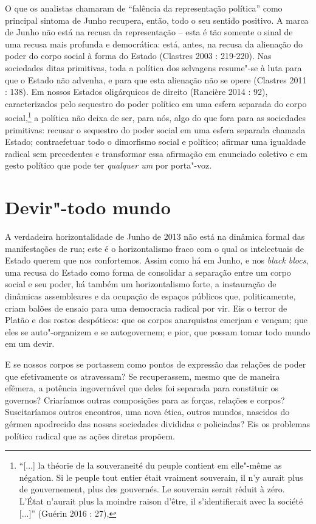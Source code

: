 O que os analistas chamaram de ``falência da representação política''
como principal sintoma de Junho recupera, então, todo o seu sentido
positivo. A marca de Junho não está na recusa da representação -- esta é
tão somente o sinal de uma recusa mais profunda e democrática: está,
antes, na recusa da alienação do poder do corpo social à forma do Estado
(Clastres 2003 : 219-220). Nas sociedades ditas primitivas, toda a
política dos selvagens resume"-se à luta para que o Estado não advenha, e
para que esta alienação não se opere (Clastres 2011 : 138). Em nossos
Estados oligárquicos de direito (Rancière 2014 : 92), caracterizados
pelo sequestro do poder político em uma esfera separada do corpo
social,\footnote{``{[}...{]} la théorie de la souveraneité du peuple
  contient em elle"-même as négation. Si le peuple tout entier était
  vraiment souverain, il n'y aurait plus de gouvernement, plus des
  gouvernés. Le souverain serait réduit à zéro. L'État n'aurait plus la
  moindre raison d'être, il s'identifierait avec la société {[}...{]}''
  (Guérin 2016 : 27),} a política não deixa de ser, para nós, algo do
que fora para as sociedades primitivas: recusar o sequestro do poder
social em uma esfera separada chamada Estado; contraefetuar todo o
dimorfismo social e político; afirmar uma igualdade radical sem
precedentes e transformar essa afirmação em enunciado coletivo e em
gesto político que pode ter \emph{qualquer um }por porta"-voz.

\section{Devir"-todo mundo}

A verdadeira horizontalidade de Junho de
2013 não está na dinâmica formal das manifestações de rua; este é o
horizontalismo fraco com o qual os intelectuais de Estado querem que nos
confortemos. Assim como há em Junho, e nos \emph{black blocs}, uma
recusa do Estado como forma de consolidar a separação entre um corpo
social e seu poder, há também um horizontalismo forte, a instauração de
dinâmicas assembleares e da ocupação de espaços públicos que,
politicamente, criam balões de ensaio para uma democracia radical por
vir. Eis o terror de Platão e dos rostos despóticos: que os corpos
anarquistas emerjam e vençam; que eles se auto"-organizem e se
autogovernem; e pior, que possam tomar todo mundo em um devir.

E se nossos corpos se portassem como pontos de expressão das relações de
poder que efetivamente os atravessam? Se recuperassem, mesmo que de
maneira efêmera, a potência ingovernável que deles foi separada para
constituir os governos? Criaríamos outras composições para as forças,
relações e corpos? Suscitaríamos outros encontros, uma nova ética,
outros mundos, nascidos do gérmen apodrecido das nossas sociedades
divididas e policiadas? Eis os problemas político radical que as ações
diretas propõem.

